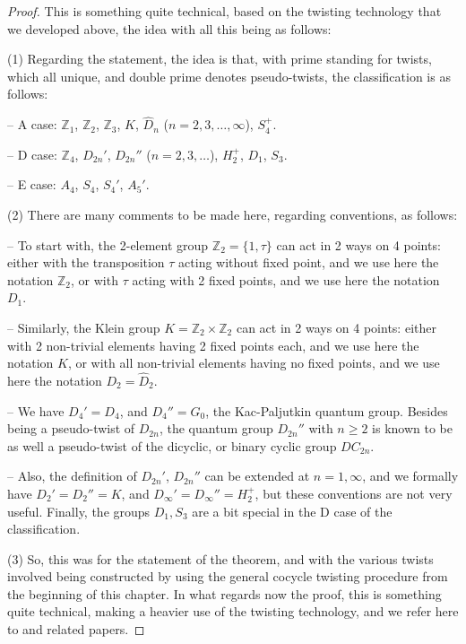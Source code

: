 \documentclass[12pt]{amsbook}
\begin{document}
\begin{proof}
This is something quite technical, based on the twisting technology that we developed above, the idea with all this being as follows:

\medskip

(1) Regarding the statement, the idea is that, with prime standing for twists, which all unique, and double prime denotes pseudo-twists, the classification is as follows:

\medskip

-- A case: $\mathbb Z_1$, $\mathbb Z_2$, $\mathbb Z_3$, $K$, $\widehat{D}_n$ ($n=2,3,\ldots,\infty$), $S_4^+$.

\medskip

-- D case: $\mathbb Z_4$, $D_{2n}'$, $D_{2n}''$ ($n=2,3,\ldots$), $H_2^+$, $D_1$, $S_3$.

\medskip

-- E case: $A_4$, $S_4$, $S_4'$, $A_5'$.

\medskip

(2) There are many comments to be made here, regarding conventions, as follows:

\medskip

-- To start with, the 2-element group $\mathbb Z_2=\{1,\tau\}$ can act in 2 ways on 4 points: either with the transposition $\tau$ acting without fixed point, and we use here the notation $\mathbb Z_2$, or with $\tau$ acting with 2 fixed points, and we use here the notation $D_1$.

\medskip

-- Similarly, the Klein group $K=\mathbb Z_2\times\mathbb Z_2$ can act in 2 ways on 4 points: either with 2 non-trivial elements having 2 fixed points each, and we use here the notation $K$, or with all non-trivial elements having no fixed points, and we use here the notation $D_2=\widehat{D}_2$.

\medskip

-- We have $D_4'=D_4$, and $D_4''=G_0$, the Kac-Paljutkin quantum group. Besides being a pseudo-twist of $D_{2n}$, the quantum group $D_{2n}''$ with $n\geq2$ is known to be as well a pseudo-twist of the dicyclic, or binary cyclic group $DC_{2n}$.

\medskip

-- Also, the definition of $D_{2n}'$, $D_{2n}''$ can be extended at $n=1,\infty$, and we formally have $D_2'=D_2''=K$, and $D_\infty'=D_\infty''=H_2^+$, but these conventions are not very useful. Finally, the groups $D_1,S_3$ are a bit special in the D case of the classification.

\medskip

(3) So, this was for the statement of the theorem, and with the various twists involved being constructed by using the general cocycle twisting procedure from the beginning of this chapter. In what regards now the proof, this is something quite technical, making a heavier use of the twisting technology, and we refer here to \cite{bb1} and related papers.
\end{proof}
\end{document}
